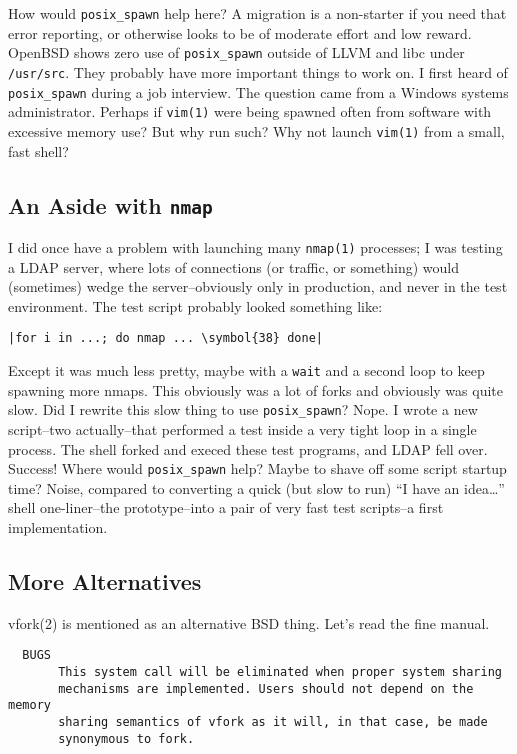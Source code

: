 \documentclass[10pt,a4paper]{article}
\begin{document}
How would \texttt{posix\_spawn} help here? A migration is a non-starter
if you need that error reporting, or otherwise looks to be of moderate
effort and low reward. OpenBSD shows zero use of \texttt{posix\_spawn}
outside of LLVM and libc under \texttt{/usr/src}. They probably have
more important things to work on. I first heard of \texttt{posix\_spawn}
during a job interview. The question came from a Windows systems
administrator. Perhaps if \texttt{vim(1)} were being spawned often from
software with excessive memory use? But why run such? Why not launch
\texttt{vim(1)} from a small, fast shell?

\subsection*{An Aside with \texttt{nmap}}

I did once have a problem with launching many \texttt{nmap(1)}
processes; I was testing a LDAP server, where lots of connections (or
traffic, or something) would (sometimes) wedge the server--obviously
only in production, and never in the test environment. The test script
probably looked something like:

\begin{lstlisting}
|for i in ...; do nmap ... \symbol{38} done|
\end{lstlisting}

Except it was much less pretty, maybe with a \texttt{wait} and a second
loop to keep spawning more nmaps. This obviously was a lot of forks and
obviously was quite slow. Did I rewrite this slow thing to use
\texttt{posix\_spawn}? Nope. I wrote a new script--two actually--that
performed a test inside a very tight loop in a single process. The shell
forked and execed these test programs, and LDAP fell over. Success!
Where would \texttt{posix\_spawn} help? Maybe to shave off some script
startup time? Noise, compared to converting a quick (but slow to run)
``I have an idea\ldots'' shell one-liner--the prototype--into a pair of
very fast test scripts--a first implementation.

\subsection*{More Alternatives}

vfork(2) is mentioned as an alternative BSD thing. Let's read the
fine manual.

\begin{lstlisting}
  BUGS
       This system call will be eliminated when proper system sharing
       mechanisms are implemented. Users should not depend on the memory
       sharing semantics of vfork as it will, in that case, be made
       synonymous to fork.
\end{lstlisting}
\end{document}
